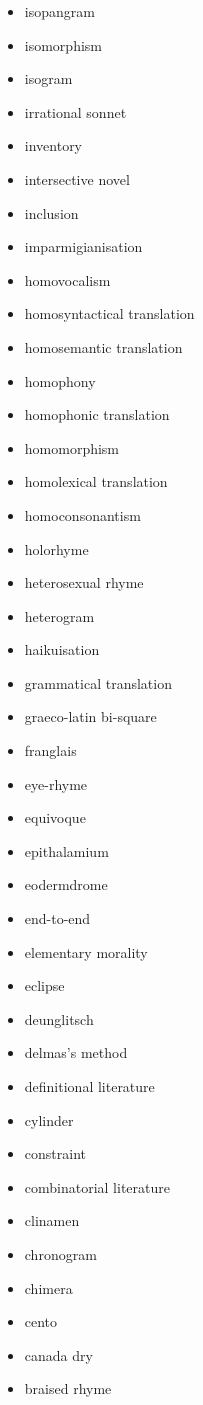 \begin{multicols}{3}
\begin{itemize}
  \item isopangram
  \item isomorphism
  \item isogram
  \item irrational sonnet
  \item inventory
  \item intersective novel
  \item inclusion
  \item imparmigianisation
  \item homovocalism
  \item homosyntactical translation
  \item homosemantic translation
  \item homophony
  \item homophonic translation
  \item homomorphism
  \item homolexical translation
  \item homoconsonantism
  \item holorhyme
  \item heterosexual rhyme
  \item heterogram
  \item haikuisation
  \item grammatical translation
  \item graeco-latin bi-square
  \item franglais
  \item eye-rhyme
  \item equivoque
  \item epithalamium
  \item eodermdrome
  \item end-to-end
  \item elementary morality
  \item eclipse
  \item deunglitsch
  \item delmas's method
  \item definitional literature
  \item cylinder
  \item constraint
  \item combinatorial literature
  \item clinamen
  \item chronogram
  \item chimera
  \item cento
  \item canada dry
  \item braised rhyme

\end{itemize}
\end{multicols}
